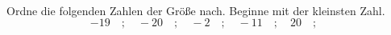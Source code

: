 \begin{aufgabe} ~ \\ 
Ordne die folgenden Zahlen der Gr\"o\ss{}e nach. Beginne mit der kleinsten Zahl.\[-19\quad ; \quad-20\quad ; \quad-2\quad ; \quad-11\quad ; \quad20\quad ; \quad\]\end{aufgabe} 
